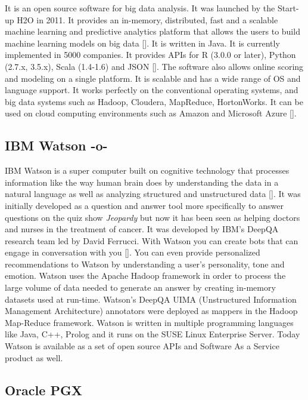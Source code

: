 It is an open source software for big data analysis. It was launched
by the Start-up H2O in 2011. It provides an in-memory, distributed,
fast and a scalable machine learning and predictive analytics platform
that allows the users to build machine learning models on big data
[\cite{www-H2O-website}]. It is written in Java. It is currently
implemented in 5000 companies. It provides APIs for R (3.0.0 or
later), Python (2.7.x, 3.5.x), Scala (1.4-1.6) and JSON
[\cite{www-H2O-book}]. The software also allows online scoring and
modeling on a single platform.  It is scalable and has a wide range of
OS and language support. It works perfectly on the conventional
operating systems, and big data systems such as Hadoop, Cloudera,
MapReduce, HortonWorks.  It can be used on cloud computing
environments such as Amazon and Microsoft Azure [\cite{www-H2O-wiki}].


\subsection{IBM Watson -o-}

IBM Watson is a super computer built on cognitive technology that
processes information like the way human brain does by understanding
the data in a natural language as well as analyzing structured and
unstructured data [\cite{www-ibmwatson-wiki}].  It was initially
developed as a question and answer tool more specifically to answer
questions on the quiz show \textit{Jeopardy} but now it has been seen as
helping doctors and nurses in the treatment of cancer. It was
developed by IBM's DeepQA research team led by David Ferrucci. With
Watson you can create bots that can engage in conversation with
you [\cite{www-ibmwatson}]. You can even provide personalized
recommendations to Watson by understanding a user's personality, tone
and emotion. Watson uses the Apache Hadoop framework in order to
process the large volume of data needed to generate an answer by
creating in-memory datasets used at run-time. Watson's DeepQA UIMA
(Unstructured Information Management Architecture) annotators were
deployed as mappers in the Hadoop Map-Reduce framework. Watson is
written in multiple programming languages like Java, C++, Prolog and
it runs on the SUSE Linux Enterprise Server. Today Watson is available
as a set of open source APIs and Software As a Service product as
well\cite{www-ibmwatson}.


    
\subsection{Oracle PGX}


